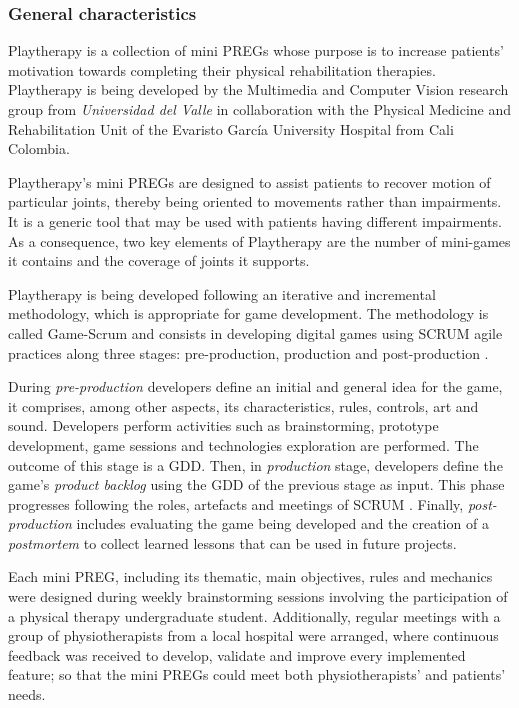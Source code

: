 \subsubsection{General characteristics}
Playtherapy is a collection of mini \acp{PREG} whose purpose is to increase patients' motivation towards completing their physical rehabilitation therapies. Playtherapy is being developed by the Multimedia and Computer Vision research group from \textit{Universidad del Valle} in collaboration with the Physical Medicine and Rehabilitation Unit of the Evaristo Garc\'ia University Hospital from Cali Colombia. 

Playtherapy's mini \acp{PREG} are designed to assist patients to recover motion of particular joints, thereby being oriented to movements rather than impairments. It is a generic tool that may be used with patients having different impairments. As a consequence, two key elements of Playtherapy are the number of mini-games it contains and the coverage of joints it supports.

Playtherapy is being developed following an iterative and incremental methodology, which is appropriate for game development. The methodology is called Game-Scrum and consists in developing digital games using SCRUM agile practices along three stages: pre-production, production and post-production \autocite{godoy2010game}.

During \emph{pre-production} developers define an initial and general idea for the game, it comprises, among other aspects, its characteristics, rules, controls, art and sound. Developers perform activities such as brainstorming, prototype development, game sessions and technologies exploration are performed. The outcome of this stage is a \ac{GDD}. Then, in \emph{production} stage, developers define the game's \textit{product backlog} using the \ac{GDD} of the previous stage as input. This phase progresses following the roles, artefacts and meetings of SCRUM \autocite{keith_agile_2010}. Finally, \emph{post-production} includes evaluating the game being developed and the creation of a \textit{postmortem} to collect learned lessons that can be used in future projects.

Each mini \ac{PREG}, including its thematic, main objectives, rules and mechanics were designed during weekly brainstorming sessions involving the participation of a physical therapy undergraduate student. Additionally, regular meetings with a group of physiotherapists from a local hospital were arranged, where continuous feedback was received to develop, validate and improve every implemented feature; so that the mini \acp{PREG} could meet both physiotherapists' and patients' needs.

